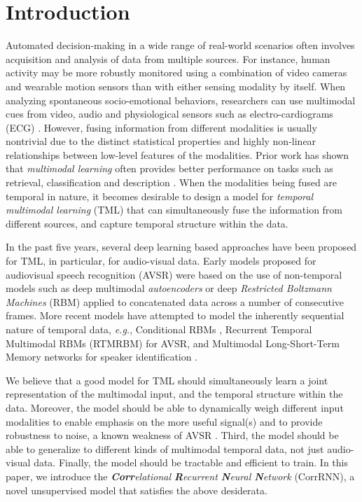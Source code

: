 \documentclass[10pt,twocolumn,letterpaper]{article}
\begin{document}
\section{Introduction}
\label{sec:intro}

Automated decision-making in a wide range of real-world scenarios often involves acquisition and analysis of data from multiple sources. For instance, human activity may be more robustly monitored using a combination of video cameras and wearable motion sensors than with either sensing modality by itself. When analyzing spontaneous socio-emotional behaviors, researchers can use multimodal cues from video, audio and physiological sensors such as electro-cardiograms (ECG) \cite{ringeval2015av+}. However, fusing information from different modalities is usually nontrivial due to the distinct statistical properties and highly non-linear relationships between low-level features \cite{srivastava2012multimodal} of the modalities. Prior work has shown that \textit{multimodal learning} often provides better performance on tasks such as retrieval, classification and description \cite{kiros2014multimodal,ngiam2011multimodal, srivastava2012multimodal,neverova2016moddrop}. When the modalities being fused are temporal in nature, it becomes desirable to design a model for \textit{temporal multimodal learning} (TML) that can simultaneously fuse the information from different sources, and capture temporal structure within the data.

In the past five years, several deep learning based approaches have been proposed for TML, in particular, for audio-visual data. Early models proposed for audiovisual speech recognition (AVSR) were based on the use of non-temporal models such as deep multimodal \textit{autoencoders} \cite{ngiam2011multimodal} or deep \textit{Restricted Boltzmann Machines} (RBM) \cite{srivastava2012multimodal,sui2015listening} applied to concatenated data across a number of consecutive frames. More recent models have attempted to model the inherently sequential nature of temporal data, \textit{e.g.}, Conditional RBMs \cite{amer2014multimodal}, Recurrent Temporal Multimodal RBMs (RTMRBM) \cite{hu2016temporal} for AVSR, and Multimodal Long-Short-Term Memory networks for speaker identification \cite{ren2016look}.

We believe that a good model for TML should simultaneously learn a joint representation of the multimodal input, and the temporal structure within the data. Moreover, the model should be able to dynamically weigh different input modalities to enable emphasis on the more useful signal(s) and to provide robustness to noise, a known weakness of AVSR \cite{katsaggelos2015audiovisual}. Third, the model should be able to generalize to different kinds of multimodal temporal data, not just audio-visual data. Finally, the model should be tractable and efficient to train. In this paper, we introduce the \textit{\textbf{Corr}elational \textbf{R}ecurrent \textbf{N}eural \textbf{N}etwork} (CorrRNN), a novel unsupervised model that satisfies the above desiderata.
\end{document}
